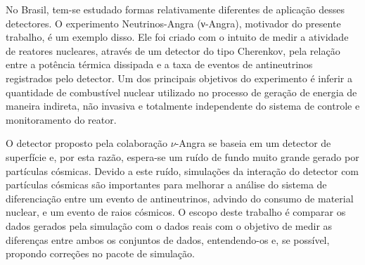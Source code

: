No Brasil, tem-se estudado formas relativamente diferentes de aplicação  desses detectores. O experimento Neutrinos-Angra (ν-Angra), motivador do presente trabalho, é um exemplo disso. Ele foi criado com o intuito de medir a atividade de reatores nucleares, através de um detector do tipo Cherenkov, pela relação entre a  potência térmica dissipada e a taxa de eventos de antineutrinos registrados pelo detector. Um dos principais objetivos do experimento é inferir a quantidade de combustível nuclear utilizado no processo de geração de energia de maneira indireta, não invasiva e totalmente independente do sistema de controle e monitoramento do reator. 

O detector proposto pela colaboração $\nu$-Angra se baseia em um detector de superfície e, por esta razão, espera-se um ruído de fundo muito grande gerado por partículas cósmicas. Devido a este ruído, simulações da interação do detector com partículas cósmicas são importantes para melhorar a análise do sistema de diferenciação entre um evento de antineutrinos, advindo do consumo de material nuclear, e um evento de raios cósmicos.
O escopo deste trabalho é comparar os dados gerados pela simulação com o dados reais com o objetivo de medir as diferenças entre ambos os conjuntos de dados, entendendo-os e, se possível,  propondo correções no pacote de simulação.



%
%
%
%

